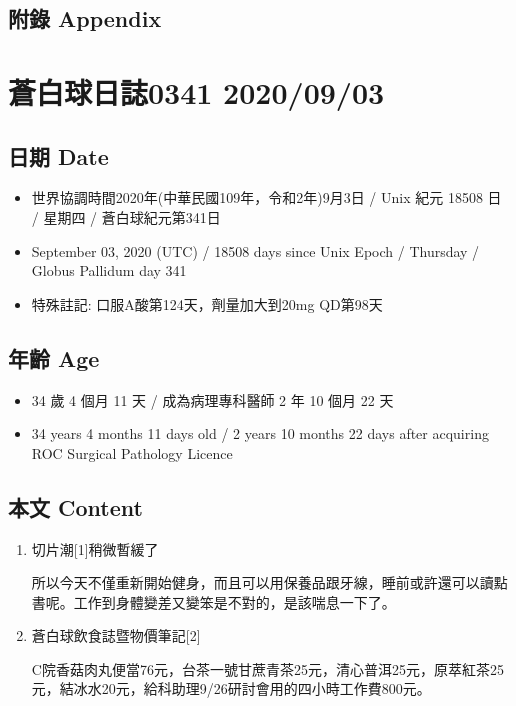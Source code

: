 \documentclass[a5paper, 11pt
]{book}
\providecommand{\tightlist}{%
  \setlength{\itemsep}{0pt}\setlength{\parskip}{0pt}}
\begin{document}
\hypertarget{ux9644ux9304-appendix-1}{%
\subsection{附錄 Appendix}\label{ux9644ux9304-appendix-1}}

\hypertarget{ux84bcux767dux7403ux65e5ux8a8c0341-20200903}{%
\section{蒼白球日誌0341
2020/09/03}\label{ux84bcux767dux7403ux65e5ux8a8c0341-20200903}}

\hypertarget{ux65e5ux671f-date-2}{%
\subsection{日期 Date}\label{ux65e5ux671f-date-2}}

\begin{itemize}
\tightlist
\item
  世界協調時間2020年(中華民國109年，令和2年)9月3日 / Unix 紀元 18508 日
  / 星期四 / 蒼白球紀元第341日
\item
  September 03, 2020 (UTC) / 18508 days since Unix Epoch / Thursday /
  Globus Pallidum day 341
\item
  特殊註記: 口服A酸第124天，劑量加大到20mg QD第98天
\end{itemize}

\hypertarget{ux5e74ux9f61-age-2}{%
\subsection{年齡 Age}\label{ux5e74ux9f61-age-2}}

\begin{itemize}
\tightlist
\item
  34 歲 4 個月 11 天 / 成為病理專科醫師 2 年 10 個月 22 天
\item
  34 years 4 months 11 days old / 2 years 10 months 22 days after
  acquiring ROC Surgical Pathology Licence
\end{itemize}

\hypertarget{ux672cux6587-content-2}{%
\subsection{本文 Content}\label{ux672cux6587-content-2}}

\begin{enumerate}
\def\labelenumi{\arabic{enumi}.}
\item
  切片潮{[}1{]}稍微暫緩了

  所以今天不僅重新開始健身，而且可以用保養品跟牙線，睡前或許還可以讀點書呢。工作到身體變差又變笨是不對的，是該喘息一下了。
\item
  蒼白球飲食誌暨物價筆記{[}2{]}

  C院香菇肉丸便當76元，台茶一號甘蔗青茶25元，清心普洱25元，原萃紅茶25元，結冰水20元，給科助理9/26研討會用的四小時工作費800元。
\end{enumerate}
\end{document}
